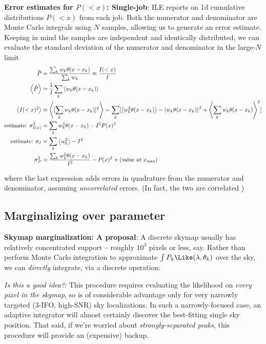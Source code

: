 \begin{widetext}
\noindent \textbf{Error estimates for $P(<x)$: Single-job}:  ILE reports on 1d cumulative distributions $P(<x)$ from
each job.  Both the numerator and denominator are Monte Carlo integrals using $N$ samples, allowing us to generate an
error estimate.  Keeping in mind the samples are independent and identically distributed, we can evaluate the standard
deviation of the numerator and denominator in the large-$N$ limit
\begin{align}
\hat{P} &= \frac{\sum_k w_k \theta(x-x_k)}{\sum_k w_k} \equiv \frac{ I(<x)}{I} \\
\left< \hat{P} \right> &\simeq \frac{1}{I} \sum_k \left<w_k \theta(x-x_k) \right>  \\
\left<I(<x)^2\right>& \equiv \left<[\sum_k w_k \theta(x-x_k)]^2\right> 
  = \sum_k[ \left<w_k^2 \theta(x-x_k)\right>  -\left<w_k\theta(x-x_k)\right>^2
  + \left<\sum_{k} w_k \theta(x-x_k)\right>^2]  \\
\text{estimate: }\sigma_{I(x)}^2 &= \sum_k w_k^2 \theta(x-x_k)  - I^2 P(x)^2 \\
\text{estimate: } \sigma_{I} &= \sum_k \left<w_k^2\right> - I^2 \\
\sigma_P^2 & \simeq \frac{\sum_k w_k^2 \theta(x-x_k)}{I^2} - P(x)^2 + (\text{value at } x_{\rm max})
\end{align}
\end{widetext}
where the last expression adds errors in quadrature from the numerator and denominator, assuming \emph{uncorrelated}
errors.    (In fact, the two are correlated )



\subsection{Marginalizing over parameter}

\noindent \textbf{Skymap marginalization: A proposal}: A discrete skymap usually has relatively concentrated support -- roughly
$10^3$ pixels or less, say.  Rather than perform Monte Carlo integration to approximate $\int P_k
\Like(\lambda,\theta_k)$ over the sky, we can \emph{directly} integrate, via a discrete operation:


\emph{Is this a good idea?}: This procedure requires evaluating the likelihood on  \emph{every pixel in the skymap}, so
is of considerable advantage only for very
narrowly targeted (3-IFO, high-SNR) sky localizations.  In such a narrowly-focused case, an adaptive integrator will almost certainly
discover the best-fitting single sky position.  That said, if we're worried about \emph{strongly-separated peaks}, this
procedure will provide an (expensive) backup.

